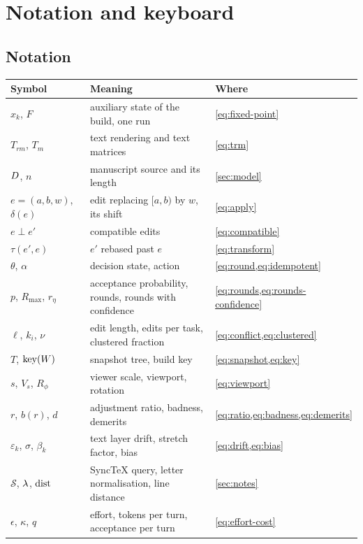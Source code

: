 \section{Notation and keyboard}
\label{app:reference}

\subsection{Notation}

\begin{center}
\small
\begin{tabular}{@{}lll@{}}
\toprule
Symbol & Meaning & Where \\
\midrule
$x_k$, $F$ & auxiliary state of the build, one run & \cref{eq:fixed-point} \\
$T_{rm}$, $T_m$ & text rendering and text matrices & \cref{eq:trm} \\
$D$, $n$ & manuscript source and its length & \cref{sec:model} \\
$e = (a, b, w)$, $\delta(e)$ & edit replacing $[a, b)$ by $w$, its shift & \cref{eq:apply} \\
$e \perp e'$ & compatible edits & \cref{eq:compatible} \\
$\tau(e', e)$ & $e'$ rebased past $e$ & \cref{eq:transform} \\
$\theta$, $\alpha$ & decision state, action & \cref{eq:round,eq:idempotent} \\
$p$, $R_{\max}$, $r_{\eta}$ & acceptance probability, rounds, rounds with confidence & \cref{eq:rounds,eq:rounds-confidence} \\
$\ell$, $k_i$, $\nu$ & edit length, edits per task, clustered fraction & \cref{eq:conflict,eq:clustered} \\
$T$, $\operatorname{key}(W)$ & snapshot tree, build key & \cref{eq:snapshot,eq:key} \\
$s$, $V_s$, $R_{\phi}$ & viewer scale, viewport, rotation & \cref{eq:viewport} \\
$r$, $b(r)$, $d$ & adjustment ratio, badness, demerits & \cref{eq:ratio,eq:badness,eq:demerits} \\
$\varepsilon_k$, $\sigma$, $\beta_k$ & text layer drift, stretch factor, bias & \cref{eq:drift,eq:bias} \\
$\mathcal{S}$, $\lambda$, $\operatorname{dist}$ & SyncTeX query, letter normalisation, line distance & \cref{sec:notes} \\
$\epsilon$, $\kappa$, $q$ & effort, tokens per turn, acceptance per turn & \cref{eq:effort-cost} \\

\end{tabular}
\end{center}
